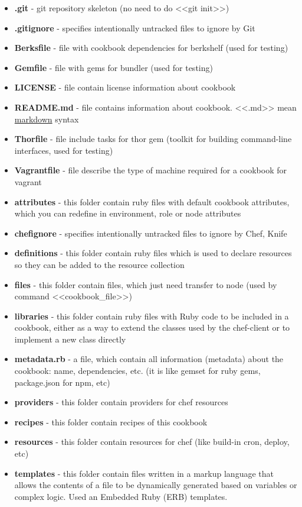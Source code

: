 \begin{itemize}
  \item \textbf{.git} - git repository skeleton (no need to do <<git init>>)
  \item \textbf{.gitignore} - specifies intentionally untracked files to ignore by Git
  \item \textbf{Berksfile} - file with cookbook dependencies for berkshelf (used for testing)
  \item \textbf{Gemfile} - file with gems for bundler (used for testing)
  \item \textbf{LICENSE} - file contain license information about cookbook
  \item \textbf{README.md} - file contains information about cookbook. <<.md>> mean \href{http://daringfireball.net/projects/markdown/syntax}{markdown} syntax
  \item \textbf{Thorfile} - file include tasks for thor gem (toolkit for building command-line interfaces, used for testing)
  \item \textbf{Vagrantfile} - file describe the type of machine required for a cookbook for vagrant
  \item \textbf{attributes} - this folder contain ruby files with default cookbook attributes, which you can redefine in environment, role or node attributes
  \item \textbf{chefignore} - specifies intentionally untracked files to ignore by Chef, Knife
  \item \textbf{definitions} - this folder contain ruby files which is used to declare resources so they can be added to the resource collection
  \item \textbf{files} - this folder contain files, which just need transfer to node (used by command <<cookbook\_file>>)
  \item \textbf{libraries} - this folder contain ruby files with Ruby code to be included in a cookbook, either as a way to extend the classes used by the chef-client or to implement a new class directly
  \item \textbf{metadata.rb} - a file, which contain all information (metadata) about the cookbook: name, dependencies, etc. (it is like gemset for ruby gems, package.json for npm, etc)
  \item \textbf{providers} - this folder contain providers for chef resources
  \item \textbf{recipes} - this folder contain recipes of this cookbook
  \item \textbf{resources} - this folder contain resources for chef (like build-in cron, deploy, etc)
  \item \textbf{templates} - this folder contain files written in a markup language that allows the contents of a file to be dynamically generated based on variables or complex logic. Used an Embedded Ruby (ERB) templates.
\end{itemize}
